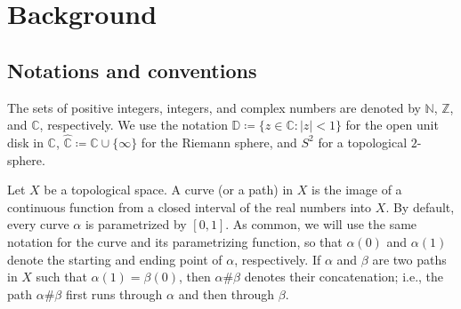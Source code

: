 \documentclass{amsart}
\theoremstyle{plain}
\theoremstyle{definition}
\theoremstyle{remark}
\newcommand{\N}{{\mathbb N}}
\newcommand{\Z}{{\mathbb Z}}
\newcommand{\C}{{\mathbb C}}
\newcommand{\disk}{{\mathbb D}}
\begin{document}
%
%
%
%





\section{Background}
\subsection{Notations and conventions}
\label{ss:Not Conv}
 The sets of positive integers, integers, and complex numbers are denoted by $\N$, $\Z$, and $\C$, respectively. We use the notation $\disk \coloneq\{z \in \C\colon |z|<1\}$ for the open unit disk in $\C$, $\widehat{\C}\coloneq\C\cup\{\infty\}$ for the Riemann sphere, and $S^2$ for a topological $2$-sphere.

Let $X$ be a topological space. A curve (or a path) in $X$ is the image of a continuous function from a closed interval of the real numbers into $X$. By default, every curve $\alpha$ is parametrized by $[0,1]$. As common, we will use the same notation for the curve and its parametrizing function, so that $\alpha(0)$ and $\alpha(1)$ denote the starting and ending point of $\alpha$, respectively.  If $\alpha$ and $\beta$ are two paths in $X$ such that $\alpha(1)=\beta(0)$, then $\alpha\# \beta$ denotes their concatenation; i.e., the path $\alpha\# \beta$ first runs through $\alpha$ and then through $\beta$. 


\end{document}
